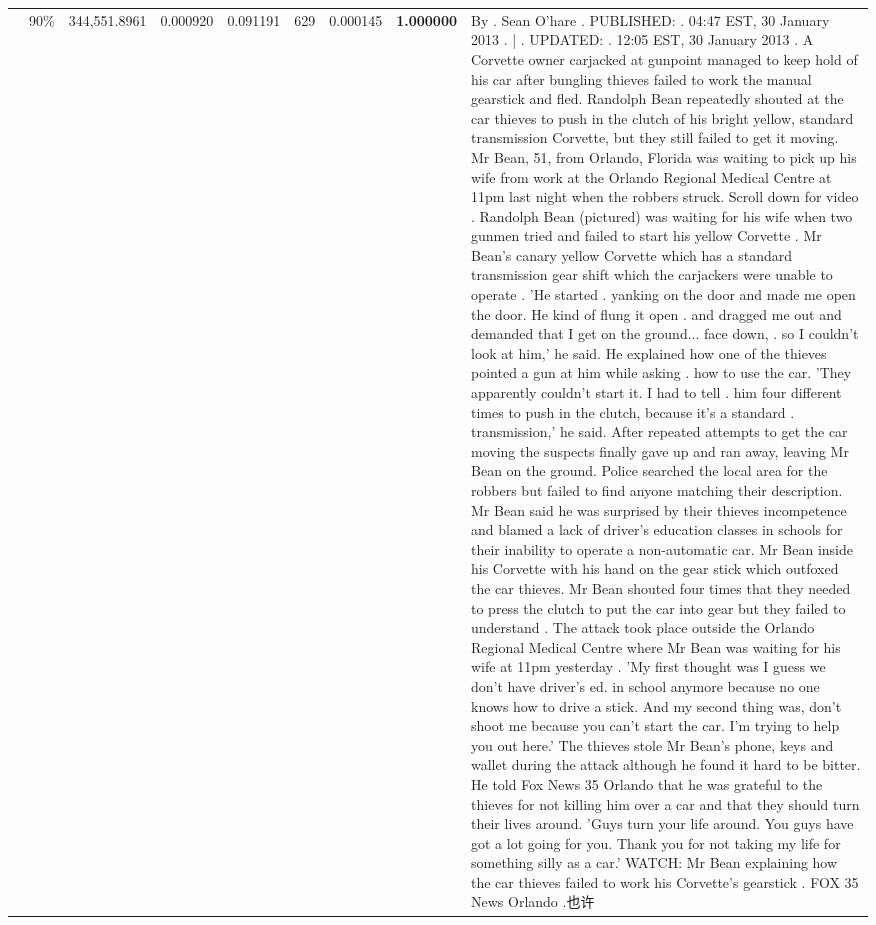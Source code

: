 \begin{table}[H]
\begin{tabular}{llrrrrrrl}
 & 90\% & 344,551.8961 & 0.000920 & 0.091191 & \color{red} 629 & 0.000145 & \bfseries \color{red} 1.000000 & By . Sean O'hare . PUBLISHED: . 04:47 EST, 30 January 2013 . | . UPDATED: . 12:05 EST, 30 January 2013 . A Corvette owner carjacked at gunpoint managed to keep hold of his car after bungling thieves failed to work the manual gearstick and fled. Randolph Bean repeatedly shouted at the car thieves to push in the clutch of his bright yellow, standard transmission Corvette, but they still failed to get it moving. Mr Bean, 51, from Orlando, Florida was waiting to pick up his wife from work at the Orlando Regional Medical Centre at 11pm last night when the robbers struck. Scroll down for video . Randolph Bean (pictured) was waiting for his wife when two gunmen tried and failed to start his yellow Corvette . Mr Bean's canary yellow Corvette which has a standard transmission gear shift which the carjackers were unable to operate . 'He started . yanking on the door and made me open the door. He kind of flung it open . and dragged me out and demanded that I get on the ground... face down, . so I couldn't look at him,' he said. He explained how one of the thieves pointed a gun at him while asking . how to use the car. 'They apparently couldn't start it. I had to tell . him four different times to push in the clutch, because it's a standard . transmission,' he said. After repeated attempts to get the car moving the suspects finally gave up and ran away, leaving Mr Bean on the ground. Police searched the local area for the robbers but failed to find anyone matching their description. Mr Bean said he was surprised by their thieves incompetence and blamed a lack of driver's education classes in schools for their inability to operate a non-automatic car. Mr Bean inside his Corvette with his hand on the gear stick which outfoxed the car thieves. Mr Bean shouted four times that they needed to press the clutch to put the car into gear but they failed to understand . The attack took place outside the Orlando Regional Medical Centre where Mr Bean was waiting for his wife at 11pm yesterday . 'My first thought was I guess we don't have driver's ed. in school anymore because no one knows how to drive a stick. And my second thing was, don't shoot me because you can't start the car. I'm trying to help you out here.' The thieves stole Mr Bean's phone, keys and wallet during the attack although he found it hard to be bitter. He told Fox News 35 Orlando that he was grateful to the thieves for not killing him over a car and that they should turn their lives around. 'Guys turn your life around. You guys have got a lot going for you. Thank you for not taking my life for something silly as a car.' WATCH: Mr Bean explaining how the car thieves failed to work his Corvette's gearstick . FOX 35 News Orlando .也许 \\

\end{tabular}
\end{table}
